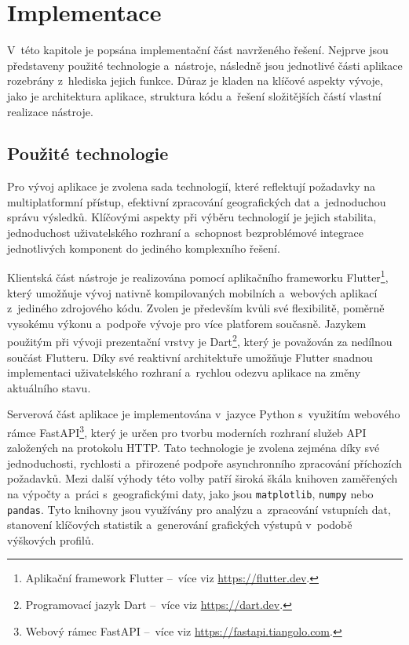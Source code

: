 \chapter{Implementace}
\label{implementation}

V~této kapitole je popsána implementační část navrženého řešení.
Nejprve jsou představeny použité technologie a~nástroje, následně jsou jednotlivé části aplikace rozebrány z~hlediska jejich funkce.
Důraz je kladen na klíčové aspekty vývoje, jako je architektura aplikace, struktura kódu a~řešení složitějších částí vlastní realizace nástroje.

\section{Použité technologie}
\label{technologiew-used}

Pro vývoj aplikace je zvolena sada technologií, které reflektují požadavky na multiplatformní přístup, efektivní zpracování geografických dat a~jednoduchou správu výsledků.
Klíčovými aspekty při výběru technologií je jejich stabilita, jednoduchost uživatelského rozhraní a~schopnost bezproblémové integrace jednotlivých komponent do jediného komplexního řešení.

Klientská část nástroje je realizována pomocí aplikačního frameworku Flutter\footnote{Aplikační framework Flutter --~více viz \url{https://flutter.dev}.}, který umožňuje vývoj nativně kompilovaných mobilních a~webových aplikací z~jediného zdrojového kódu.
Zvolen je především kvůli své flexibilitě, poměrně vysokému výkonu a~podpoře vývoje pro více platforem současně.
Jazykem použitým při vývoji prezentační vrstvy je Dart\footnote{Programovací jazyk Dart --~více viz \url{https://dart.dev}.}, který je považován za nedílnou součást Flutteru.
Díky své reaktivní architektuře umožňuje Flutter snadnou implementaci uživatelského rozhraní a~rychlou odezvu aplikace na změny aktuálního stavu.

Serverová část aplikace je implementována v~jazyce Python s~využitím webového rámce FastAPI\footnote{Webový rámec FastAPI --~více viz \url{https://fastapi.tiangolo.com}.}, který je určen pro tvorbu moderních rozhraní služeb API založených na protokolu HTTP.
Tato technologie je zvolena zejména díky své jednoduchosti, rychlosti a~přirozené podpoře asynchronního zpracování příchozích požadavků.
Mezi další výhody této volby patří široká škála knihoven zaměřených na výpočty a~práci s~geografickými daty, jako jsou \texttt{matplotlib}, \texttt{numpy} nebo \texttt{pandas}.
Tyto knihovny jsou využívány pro analýzu a~zpracování vstupních dat, stanovení klíčových statistik a~generování grafických výstupů v~podobě výškových profilů.

